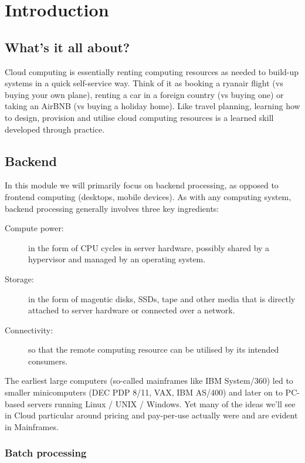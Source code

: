 \chapter{Introduction}
\label{ch:intro}

\linktocodefiles

\section{What's it all about?}
\label{sec:whats-it-all-about}

Cloud computing is essentially renting computing resources as needed to
build-up systems in a quick self-service way. Think of it as booking a
ryanair flight (vs buying your own plane), renting a car in a foreign
country (vs buying one) or taking an AirBNB (vs buying a holiday home).
Like travel planning, learning how to design, provision and utilise
cloud computing resources is a learned skill developed through practice.

\section{Backend}
\label{sec:backend}

In this module we will primarily focus on backend processing, as opposed
to frontend computing (desktops, mobile devices). As with any computing
system, backend processing generally involves three key ingredients:

\begin{description}
\item[Compute power:]
in the form of CPU cycles in server hardware, possibly shared by a
hypervisor and managed by an operating system.
\item[Storage:]
in the form of magentic disks, SSDs, tape and other media that is
directly attached to server hardware or connected over a network.
\item[Connectivity:]
so that the remote computing resource can be utilised by its intended
consumers.
\end{description}

The earliest large computers (so-called mainframes like IBM System/360)
led to smaller minicomputers (DEC PDP 8/11, VAX, IBM AS/400) and later
on to PC-based servers running Linux / UNIX / Windows. Yet many of the
ideas we'll see in Cloud particular around pricing and pay-per-use
actually were and are evident in Mainframes.

\subsection{Batch processing}
\label{sec:batch-processing}

